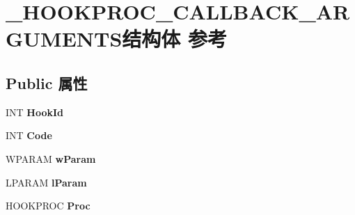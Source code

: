 \hypertarget{struct___h_o_o_k_p_r_o_c___c_a_l_l_b_a_c_k___a_r_g_u_m_e_n_t_s}{}\section{\+\_\+\+H\+O\+O\+K\+P\+R\+O\+C\+\_\+\+C\+A\+L\+L\+B\+A\+C\+K\+\_\+\+A\+R\+G\+U\+M\+E\+N\+T\+S结构体 参考}
\label{struct___h_o_o_k_p_r_o_c___c_a_l_l_b_a_c_k___a_r_g_u_m_e_n_t_s}
\subsection*{Public 属性}
\begin{DoxyCompactItemize}
\item 
\mbox{\label{struct___h_o_o_k_p_r_o_c___c_a_l_l_b_a_c_k___a_r_g_u_m_e_n_t_s_a304f557d2aad18392f07d4714c6f35fc}} 
I\+NT {\bfseries Hook\+Id}
\item 
\mbox{\label{struct___h_o_o_k_p_r_o_c___c_a_l_l_b_a_c_k___a_r_g_u_m_e_n_t_s_a259733a10e9e8d9ce7871f5d11947366}} 
I\+NT {\bfseries Code}
\item 
\mbox{\label{struct___h_o_o_k_p_r_o_c___c_a_l_l_b_a_c_k___a_r_g_u_m_e_n_t_s_aa507732c5dd80b4e735cd48be77d54c8}} 
W\+P\+A\+R\+AM {\bfseries w\+Param}
\item 
\mbox{\label{struct___h_o_o_k_p_r_o_c___c_a_l_l_b_a_c_k___a_r_g_u_m_e_n_t_s_a01a373c4d6b279ea5058668eb92d47fe}} 
L\+P\+A\+R\+AM {\bfseries l\+Param}
\item 
\mbox{\label{struct___h_o_o_k_p_r_o_c___c_a_l_l_b_a_c_k___a_r_g_u_m_e_n_t_s_a823c6f86c2e9105e0b1c9f2a64655670}} 
H\+O\+O\+K\+P\+R\+OC {\bfseries Proc}
\item 
\mbox{\label{struct___h_o_o_k_p_r_o_c___c_a_l_l_b_a_c_k___a_r_g_u_m_e_n_t_s_a64b68c05fb82aa4e6b47d878590b9244}} 

\end{DoxyCompactItemize}
